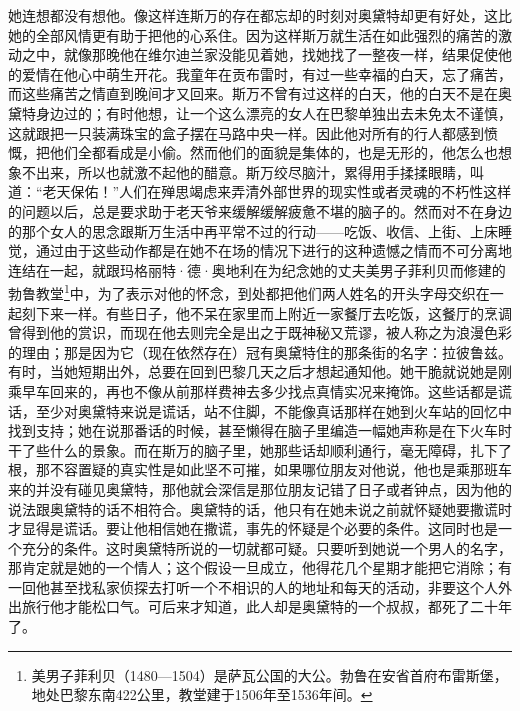 \par 她连想都没有想他。像这样连斯万的存在都忘却的时刻对奥黛特却更有好处，这比她的全部风情更有助于把他的心系住。因为这样斯万就生活在如此强烈的痛苦的激动之中，就像那晚他在维尔迪兰家没能见着她，找她找了一整夜一样，结果促使他的爱情在他心中萌生开花。我童年在贡布雷时，有过一些幸福的白天，忘了痛苦，而这些痛苦之情直到晚间才又回来。斯万不曾有过这样的白天，他的白天不是在奥黛特身边过的；有时他想，让一个这么漂亮的女人在巴黎单独出去未免太不谨慎，这就跟把一只装满珠宝的盒子摆在马路中央一样。因此他对所有的行人都感到愤慨，把他们全都看成是小偷。然而他们的面貌是集体的，也是无形的，他怎么也想象不出来，所以也就激不起他的醋意。斯万绞尽脑汁，累得用手揉揉眼睛，叫道：“老天保佑！”人们在殚思竭虑来弄清外部世界的现实性或者灵魂的不朽性这样的问题以后，总是要求助于老天爷来缓解缓解疲惫不堪的脑子的。然而对不在身边的那个女人的思念跟斯万生活中再平常不过的行动——吃饭、收信、上街、上床睡觉，通过由于这些动作都是在她不在场的情况下进行的这种遗憾之情而不可分离地连结在一起，就跟玛格丽特·德·奥地利在为纪念她的丈夫美男子菲利贝而修建的勃鲁教堂\footnote{美男子菲利贝（1480—1504）是萨瓦公国的大公。勃鲁在安省首府布雷斯堡，地处巴黎东南422公里，教堂建于1506年至1536年间。}中，为了表示对他的怀念，到处都把他们两人姓名的开头字母交织在一起刻下来一样。有些日子，他不呆在家里而上附近一家餐厅去吃饭，这餐厅的烹调曾得到他的赏识，而现在他去则完全是出之于既神秘又荒谬，被人称之为浪漫色彩的理由；那是因为它（现在依然存在）冠有奥黛特住的那条街的名字：拉彼鲁兹。有时，当她短期出外，总要在回到巴黎几天之后才想起通知他。她干脆就说她是刚乘早车回来的，再也不像从前那样费神去多少找点真情实况来掩饰。这些话都是谎话，至少对奥黛特来说是谎话，站不住脚，不能像真话那样在她到火车站的回忆中找到支持；她在说那番话的时候，甚至懒得在脑子里编造一幅她声称是在下火车时干了些什么的景象。而在斯万的脑子里，她那些话却顺利通行，毫无障碍，扎下了根，那不容置疑的真实性是如此坚不可摧，如果哪位朋友对他说，他也是乘那班车来的并没有碰见奥黛特，那他就会深信是那位朋友记错了日子或者钟点，因为他的说法跟奥黛特的话不相符合。奥黛特的话，他只有在她未说之前就怀疑她要撒谎时才显得是谎话。要让他相信她在撒谎，事先的怀疑是个必要的条件。这同时也是一个充分的条件。这时奥黛特所说的一切就都可疑。只要听到她说一个男人的名字，那肯定就是她的一个情人；这个假设一旦成立，他得花几个星期才能把它消除；有一回他甚至找私家侦探去打听一个不相识的人的地址和每天的活动，非要这个人外出旅行他才能松口气。可后来才知道，此人却是奥黛特的一个叔叔，都死了二十年了。
